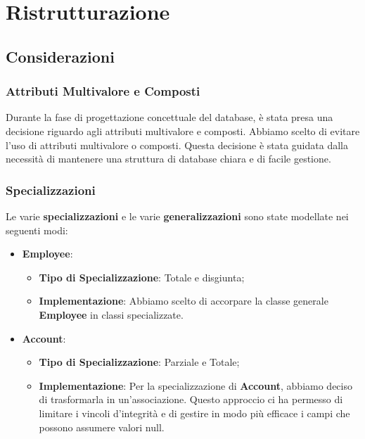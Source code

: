 \newpage

\section{Ristrutturazione}

\subsection{Considerazioni}

\subsubsection{Attributi Multivalore e Composti}

Durante la fase di progettazione concettuale del database, è stata presa una decisione riguardo agli attributi multivalore e composti. Abbiamo scelto di evitare l'uso di attributi multivalore o composti. Questa decisione è stata guidata dalla necessità di mantenere una struttura di database chiara e di facile gestione.

\subsubsection{Specializzazioni}

Le varie \textbf{specializzazioni} e le varie \textbf{generalizzazioni} sono state modellate nei seguenti modi:

\begin{itemize}[leftmargin=*,label={\textbullet},itemsep=0pt,topsep=0pt,partopsep=0pt]
    \item \textbf{Employee}:
          \begin{itemize}[leftmargin=*,label={\textbullet},itemsep=0pt,topsep=0pt,partopsep=0pt]
            \item \textbf{Tipo di Specializzazione}: Totale e disgiunta;
            \item \textbf{Implementazione}: Abbiamo scelto di accorpare la classe generale \textbf{Employee} in classi specializzate.
          \end{itemize}
    \item \textbf{Account}:
          \begin{itemize}[leftmargin=*,label={\textbullet},itemsep=0pt,topsep=0pt,partopsep=0pt]
            \item \textbf{Tipo di Specializzazione}: Parziale e Totale;
            \item \textbf{Implementazione}: Per la specializzazione di \textbf{Account}, abbiamo deciso di trasformarla in un'associazione. Questo approccio ci ha permesso di limitare i vincoli d'integrità e di gestire in modo più efficace i campi che possono assumere valori null.
          \end{itemize}
\end{itemize}

